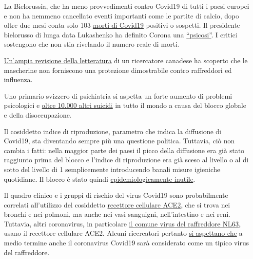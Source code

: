 La Bielorussia, che ha meno provvedimenti contro Covid19 di tutti i
paesi europei e non ha nemmeno cancellato eventi importanti come le
partite di calcio, dopo oltre due mesi conta solo 103
\href{https://en.wikipedia.org/wiki/COVID-19_pandemic_in_Belarus}{morti
di Covid19} positivi o sospetti. Il presidente bielorusso di lunga data
Lukashenko ha definito Corona una
\href{https://www.baltictimes.com/lukashenko__coronavirus_is_psychosis/}{``psicosi''}.
I critici sostengono che non stia rivelando il numero reale di morti.

\href{https://www.researchgate.net/publication/340570735_Masks_Don't_Work_A_review_of_science_relevant_to_COVID-19_social_policy}{Un'ampia
revisione della letteratura} di un ricercatore canadese ha scoperto che
le mascherine non forniscono una protezione dimostrabile contro
raffreddori ed influenza.

Uno primario svizzero di psichiatria si aspetta un forte aumento di
problemi psicologici e
\href{https://www.aargauerzeitung.ch/aargau/kanton-aargau/aargauer-psychiatrie-chefarzt-kawohl-warnt-arbeitslosigkeit-erhoeht-das-suizidrisiko-137742663}{oltre
10.000 altri suicidi} in tutto il mondo a causa del blocco globale e
della disoccupazione.

Il cosiddetto indice di riproduzione, parametro che indica la diffusione
di Covid19, sta diventando sempre più una questione politica. Tuttavia,
ciò non cambia i fatti: nella maggior parte dei paesi il picco della
diffusione era già stato raggiunto prima del blocco e l'indice di
riproduzione era già sceso al livello o al di sotto del livello di 1
semplicemente introducendo banali misure igieniche quotidiane. Il blocco
è stato quindi
\href{https://infekt.ch/2020/04/sind-wir-tatsaechlich-im-blindflug/}{epidemiologicamente
inutile}.

Il quadro clinico e i gruppi di rischio del virus Covid19 sono
probabilmente correlati all'utilizzo del cosiddetto
\href{https://www.news-medical.net/news/20200420/ACE2-TMPRSS2-profiling-indicates-tissue-vulnerability-to-SARS-CoV-2-infection.aspx}{recettore
cellulare ACE2}, che si trova nei bronchi e nei polmoni, ma anche nei
vasi sanguigni, nell'intestino e nei reni. Tuttavia, altri coronavirus,
in particolare
\href{https://www.ncbi.nlm.nih.gov/pmc/articles/PMC4369385/}{il comune
virus del raffreddore NL63}, usano il recettore cellulare ACE2. Alcuni
ricercatori pertanto
\href{https://www.ncbi.nlm.nih.gov/pmc/articles/PMC7074995/}{si
aspettano che} a medio termine anche il coronavirus Covid19 sarà
considerato come un tipico virus del raffreddore.

